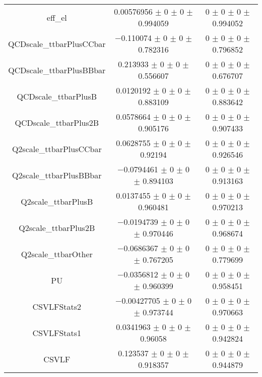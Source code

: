 \begin{table}
\begin{tabular}{ccc}
eff\_el 	& \num{0.00576956} $\pm$ \num{0} $\pm$ \num{0} $\pm$ \num{0.994059} 	& \num{0} $\pm$ \num{0} $\pm$ \num{0} $\pm$ \num{0.994052}\\
QCDscale\_ttbarPlusCCbar 	& \num{-0.110074} $\pm$ \num{0} $\pm$ \num{0} $\pm$ \num{0.782316} 	& \num{0} $\pm$ \num{0} $\pm$ \num{0} $\pm$ \num{0.796852}\\
QCDscale\_ttbarPlusBBbar 	& \num{0.213933} $\pm$ \num{0} $\pm$ \num{0} $\pm$ \num{0.556607} 	& \num{0} $\pm$ \num{0} $\pm$ \num{0} $\pm$ \num{0.676707}\\
QCDscale\_ttbarPlusB 	& \num{0.0120192} $\pm$ \num{0} $\pm$ \num{0} $\pm$ \num{0.883109} 	& \num{0} $\pm$ \num{0} $\pm$ \num{0} $\pm$ \num{0.883642}\\
QCDscale\_ttbarPlus2B 	& \num{0.0578664} $\pm$ \num{0} $\pm$ \num{0} $\pm$ \num{0.905176} 	& \num{0} $\pm$ \num{0} $\pm$ \num{0} $\pm$ \num{0.907433}\\
Q2scale\_ttbarPlusCCbar 	& \num{0.0628755} $\pm$ \num{0} $\pm$ \num{0} $\pm$ \num{0.92194} 	& \num{0} $\pm$ \num{0} $\pm$ \num{0} $\pm$ \num{0.926546}\\
Q2scale\_ttbarPlusBBbar 	& \num{-0.0794461} $\pm$ \num{0} $\pm$ \num{0} $\pm$ \num{0.894103} 	& \num{0} $\pm$ \num{0} $\pm$ \num{0} $\pm$ \num{0.913163}\\
Q2scale\_ttbarPlusB 	& \num{0.0137455} $\pm$ \num{0} $\pm$ \num{0} $\pm$ \num{0.960481} 	& \num{0} $\pm$ \num{0} $\pm$ \num{0} $\pm$ \num{0.970213}\\
Q2scale\_ttbarPlus2B 	& \num{-0.0194739} $\pm$ \num{0} $\pm$ \num{0} $\pm$ \num{0.970446} 	& \num{0} $\pm$ \num{0} $\pm$ \num{0} $\pm$ \num{0.968674}\\
Q2scale\_ttbarOther 	& \num{-0.0686367} $\pm$ \num{0} $\pm$ \num{0} $\pm$ \num{0.767205} 	& \num{0} $\pm$ \num{0} $\pm$ \num{0} $\pm$ \num{0.779699}\\
PU 	& \num{-0.0356812} $\pm$ \num{0} $\pm$ \num{0} $\pm$ \num{0.960399} 	& \num{0} $\pm$ \num{0} $\pm$ \num{0} $\pm$ \num{0.958451}\\
CSVLFStats2 	& \num{-0.00427705} $\pm$ \num{0} $\pm$ \num{0} $\pm$ \num{0.973744} 	& \num{0} $\pm$ \num{0} $\pm$ \num{0} $\pm$ \num{0.970663}\\
CSVLFStats1 	& \num{0.0341963} $\pm$ \num{0} $\pm$ \num{0} $\pm$ \num{0.96058} 	& \num{0} $\pm$ \num{0} $\pm$ \num{0} $\pm$ \num{0.942824}\\
CSVLF 	& \num{0.123537} $\pm$ \num{0} $\pm$ \num{0} $\pm$ \num{0.918357} 	& \num{0} $\pm$ \num{0} $\pm$ \num{0} $\pm$ \num{0.944879}\\

\end{tabular}
\end{table}
